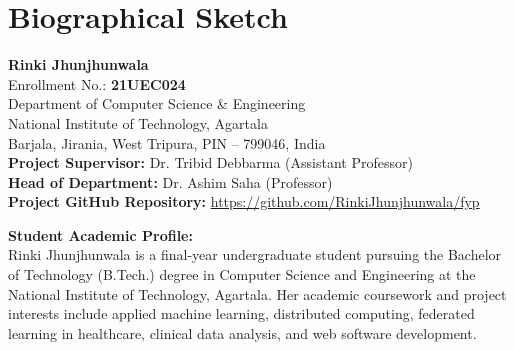 \chapter{Biographical Sketch}
\label{chap:appendix_bio}

\vspace{1.0cm}

\begin{center}
    {\Large \textbf{Rinki Jhunjhunwala}}\\
    \vspace{0.2cm}
    Enrollment No.: \textbf{21UEC024}\\
    Department of Computer Science \& Engineering\\
    National Institute of Technology, Agartala\\
    Barjala, Jirania, West Tripura, PIN -- 799046, India\\
    \vspace{0.3cm}
    \textbf{Project Supervisor:} Dr. Tribid Debbarma (Assistant Professor)\\
    \textbf{Head of Department:} Dr. Ashim Saha (Professor)\\
    \vspace{0.2cm}
    \textbf{Project GitHub Repository:} \url{https://github.com/RinkiJhunjhunwala/fyp}
\end{center}

\vspace{1cm}

\noindent \textbf{Student Academic Profile:}\\
Rinki Jhunjhunwala is a final-year undergraduate student pursuing the Bachelor of Technology (B.Tech.) degree in Computer Science and Engineering at the National Institute of Technology, Agartala. Her academic coursework and project interests include applied machine learning, distributed computing, federated learning in healthcare, clinical data analysis, and web software development.

\vspace{0.8cm}

